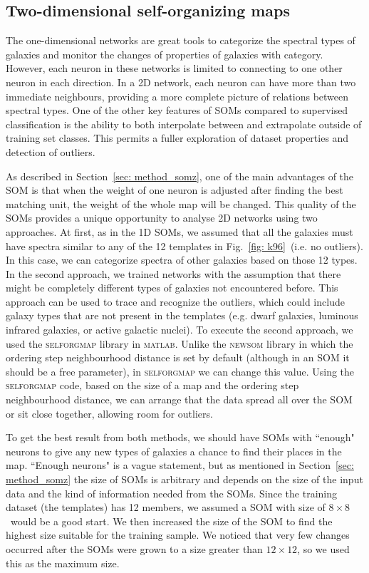       
    \subsection{Two-dimensional self-organizing maps}
    \label{sec: 2D}
        The one-dimensional networks are great tools to categorize the spectral types of galaxies and monitor the changes of properties of galaxies with category.
        However, each neuron in these networks is limited to connecting to one other neuron in each direction.
        In a 2D network, each neuron can have more than two immediate neighbours, providing a more complete picture of relations between spectral types.
        One of the other key features of SOMs compared to supervised classification is the ability to both interpolate between and extrapolate outside of training set classes.
        This permits a fuller exploration of dataset properties and detection of outliers.
        
        As described in Section~\ref{sec: method_somz}, one of the main advantages of the SOM is that when the weight of one neuron is adjusted after finding the best matching unit, the weight of the whole map will be changed.
        This quality of the SOMs provides a unique opportunity to analyse 2D networks using two approaches. 
        At first, as in the 1D SOMs, we assumed that all the galaxies must have spectra similar to any of the 12 templates in Fig.~\ref{fig: k96}~(i.e. no outliers).
        In this case, we can categorize spectra of other galaxies based on those 12 types.
        In the second approach, we trained networks with the assumption that there might be completely different types of galaxies not encountered before.
        This approach can be used to trace and recognize the outliers, which could include galaxy types that are not present in the  templates (e.g. dwarf galaxies, luminous infrared galaxies, or active galactic nuclei).
        To execute the second approach, we used the \textsc{ selforgmap} library in \textsc{matlab}.
        Unlike the \textsc{newsom} library in which the ordering step neighbourhood distance is set by default (although in an SOM it should be a free parameter), in \textsc{selforgmap} we can change this value.
        Using the \textsc{selforgmap} code, based on the size of a map and the ordering step neighbourhood distance, we can arrange that the data spread all over the SOM or sit close together, allowing room for outliers.

        To get the best result from both methods, we should have SOMs with ``enough"  neurons to give any new types of galaxies a chance to find their places in the map.
        ``Enough neurons" is a vague statement, but as mentioned in Section~\ref{sec: method_somz} the size of SOMs is arbitrary and depends on the size of the input data and the kind of information needed from the SOMs.
        Since the training dataset (the  templates) has 12 members, we assumed a SOM with size of $8\times8$~would be a good start.
        We then increased the size of the SOM to find the highest size suitable for the training sample.
        We noticed that very few changes occurred after the SOMs were grown to a size greater than $12\times12$, so we used this as the maximum size.
    
